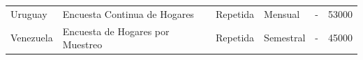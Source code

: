 \documentclass[12pt,spanish,]{book}
\begin{document}
\begin{longtable}[]{@{}llllll@{}}
\begin{minipage}[t]{0.13\columnwidth}\raggedright
Uruguay\strut
\end{minipage} & \begin{minipage}[t]{0.38\columnwidth}\raggedright
Encuesta Continua de Hogares\strut
\end{minipage} & \begin{minipage}[t]{0.06\columnwidth}\raggedright
Repetida\strut
\end{minipage} & \begin{minipage}[t]{0.08\columnwidth}\raggedright
Mensual\strut
\end{minipage} & \begin{minipage}[t]{0.06\columnwidth}\raggedright
-\strut
\end{minipage} & \begin{minipage}[t]{0.13\columnwidth}\raggedright
53000\strut
\end{minipage}\tabularnewline
\begin{minipage}[t]{0.13\columnwidth}\raggedright
Venezuela\strut
\end{minipage} & \begin{minipage}[t]{0.38\columnwidth}\raggedright
Encuesta de Hogares por Muestreo\strut
\end{minipage} & \begin{minipage}[t]{0.06\columnwidth}\raggedright
Repetida\strut
\end{minipage} & \begin{minipage}[t]{0.08\columnwidth}\raggedright
Semestral\strut
\end{minipage} & \begin{minipage}[t]{0.06\columnwidth}\raggedright
-\strut
\end{minipage} & \begin{minipage}[t]{0.13\columnwidth}\raggedright
45000\strut
\end{minipage}\tabularnewline
\bottomrule
\end{longtable}

\newpage
\end{document}
